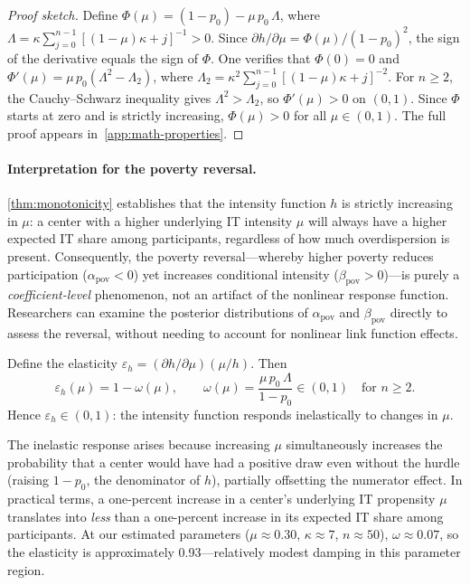 \begin{proof}[Proof sketch]
  Define $\Phi(\mu) = (1 - p_0) - \mu\, p_0\, \Lambda$, where
  $\Lambda = \kappa\sum_{j=0}^{n-1}[(1-\mu)\kappa + j]^{-1} > 0$.
  Since $\partial h / \partial\mu = \Phi(\mu)/(1-p_0)^2$, the sign of the
  derivative equals the sign of $\Phi$. One verifies that $\Phi(0) = 0$ and
  $\Phi'(\mu) = \mu\, p_0(\Lambda^2 - \Lambda_2)$, where
  $\Lambda_2 = \kappa^2\sum_{j=0}^{n-1}[(1-\mu)\kappa + j]^{-2}$.
  For $n \ge 2$, the Cauchy--Schwarz inequality gives
  $\Lambda^2 > \Lambda_2$, so $\Phi'(\mu) > 0$ on $(0,1)$.
  Since $\Phi$ starts at zero and is strictly increasing, $\Phi(\mu) > 0$ for
  all $\mu \in (0,1)$. The full proof appears in~\cref{app:math-properties}.
\end{proof}

\paragraph{Interpretation for the poverty reversal.}
\cref{thm:monotonicity} establishes that the intensity function $h$ is strictly
increasing in $\mu$: a center with a higher underlying IT intensity $\mu$ will
always have a higher expected IT share among participants, regardless of how much
overdispersion is present. Consequently, the poverty reversal---whereby higher poverty reduces participation ($\alpha_{\mathrm{pov}} < 0$) yet
increases conditional intensity ($\beta_{\mathrm{pov}} > 0$)---is purely a
\emph{coefficient-level} phenomenon, not an artifact of the nonlinear response
function. Researchers can examine the posterior distributions of
$\alpha_{\mathrm{pov}}$ and $\beta_{\mathrm{pov}}$ directly to assess the
reversal, without needing to account for nonlinear link function effects.

\begin{proposition}[Elasticity of $h$]\label{prop:elasticity}
  Define the elasticity $\varepsilon_h = (\partial h / \partial\mu)(\mu / h)$.
  Then
  \begin{equation}\label{eq:elasticity}
    \varepsilon_h(\mu) = 1 - \omega(\mu),
    \qquad
    \omega(\mu) = \frac{\mu\, p_0\, \Lambda}{1 - p_0} \in (0,1)
    \quad \text{for } n \ge 2.
  \end{equation}
  Hence $\varepsilon_h \in (0,1)$: the intensity function responds
  inelastically to changes in $\mu$.
\end{proposition}

The inelastic response arises because increasing $\mu$ simultaneously increases
the probability that a center would have had a positive draw even without the
hurdle (raising $1 - p_0$, the denominator of $h$), partially offsetting the
numerator effect. In practical terms, a one-percent increase in a center's
underlying IT propensity $\mu$ translates into \emph{less} than a one-percent
increase in its expected IT share among participants. At our estimated parameters
($\mu \approx 0.30$, $\kappa \approx 7$, $n \approx 50$), $\omega \approx 0.07$,
so the elasticity is approximately 0.93---relatively modest damping in this
parameter region.

